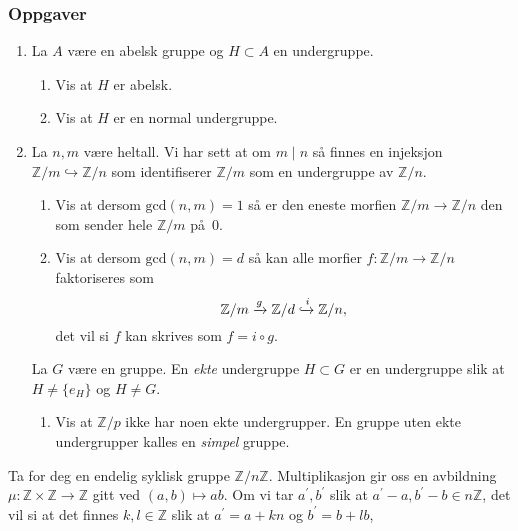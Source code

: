 \subsubsection*{Oppgaver}
\begin{enumerate}
    \item La $A$ være en abelsk gruppe og $H\subset A$ en undergruppe.
        \begin{enumerate}
            \item Vis at $H$ er abelsk.
            \item Vis at $H$ er en normal undergruppe.
        \end{enumerate}
    \item La $n, m$ være heltall.
        Vi har sett at om $m\mid n$ så finnes en injeksjon
        $\mathbb Z / m \hookrightarrow \mathbb Z / n$
        som identifiserer $\mathbb Z / m$ som en undergruppe av $\mathbb Z / n$.
        \begin{enumerate}
            \item Vis at dersom $\mathrm{gcd}(n, m) = 1$ så er den eneste morfien
                $\mathbb Z / m \to \mathbb Z / n$ den som sender hele
                $\mathbb Z / m$ på $0$.
            \item Vis at dersom $\mathrm{gcd}(n, m) = d$ så kan alle morfier
                $f\colon \mathbb Z / m \to \mathbb Z / n$ faktoriseres som
                \[
                    \mathbb Z / m
                    \xrightarrow{g} \mathbb Z / d
                    \xhookrightarrow{i} \mathbb Z / n,
                \]
                det vil si $f$ kan skrives som $f = i\circ g$.
        \end{enumerate}
        La $G$ være en gruppe. En \textit{ekte} undergruppe $H \subset G$
        er en undergruppe slik at $H\neq \{e_H\}$ og $H\neq G$.
        \begin{enumerate}[resume]
            \item Vis at $\mathbb Z / p$ ikke har noen ekte undergrupper.
                En gruppe uten ekte undergrupper kalles en \textit{simpel} gruppe.
        \end{enumerate}
\end{enumerate}
Ta for deg en endelig syklisk gruppe $\mathbb Z / n\mathbb Z$.
Multiplikasjon gir oss en avbildning
$\mu\colon \mathbb Z\times \mathbb Z\to \mathbb Z$
gitt ved $(a,b)\mapsto ab$.
Om vi tar $a^\prime, b^\prime$ slik at
$a^\prime - a, b^\prime - b\in n\mathbb Z$,
det vil si at det finnes $k, l\in \mathbb Z$ slik at
$a^\prime = a + kn$ og $b^\prime = b + lb$,
